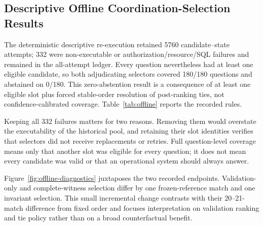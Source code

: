 \documentclass[applsci,article,submit,moreauthors]{Definitions/mdpi}
\begin{document}
\subsection{Descriptive Offline Coordination-Selection Results}

The deterministic descriptive re-execution retained 5760 candidate--state attempts; 332 were non-executable or authorization/resource/SQL failures and remained in the all-attempt ledger. Every question nevertheless had at least one eligible candidate, so both adjudicating selectors covered 180/180 questions and abstained on 0/180. This zero-abstention result is a consequence of at least one eligible slot plus forced stable-order resolution of post-ranking ties, not confidence-calibrated coverage. Table~\ref{tab:offline} reports the recorded rules.

Keeping all 332 failures matters for two reasons. Removing them would overstate the executability of the historical pool, and retaining their slot identities verifies that selectors did not receive replacements or retries. Full question-level coverage means only that another slot was eligible for every question; it does not mean every candidate was valid or that an operational system should always answer.

\begin{table}[htbp]
\caption{Descriptive release-v3 re-execution over one historical eight-slot pool per question. All methods choose after the same precomputed candidate/evidence ledger of 32 attempts per question. Accuracy is finite-corpus strict execution equality after all blackboards were sealed; this is not a new-generation or five-role end-to-end experiment.}
\label{tab:offline}
\centering
\small
{}
\end{table}

Figure~\ref{fig:offline-diagnostics} juxtaposes the two recorded endpoints. Validation-only and complete-witness selection differ by one frozen-reference match and one invariant selection. This small incremental change contrasts with their 20--21-match difference from fixed order and focuses interpretation on validation ranking and tie policy rather than on a broad counterfactual benefit.
\end{document}
